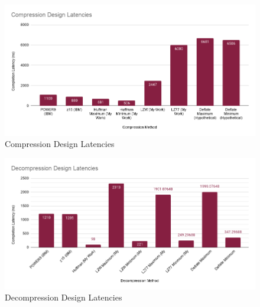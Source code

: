\documentclass[doublespace,nopageskip]{VTthesis}
\begin{document}
\begin{figure}[htb]
	\centering
	\includegraphics[scale=0.5]{Compression Design Latencies.png}
	\caption{Compression Design Latencies}
	\label{fig:compression_design_latencies}
\end{figure}
\begin{figure}[htb]
	\centering
	\includegraphics[scale=0.5]{Decompression Design Latencies.png}
	\caption{Decompression Design Latencies}
	\label{fig:decompression_design_latencies}
\end{figure}
\end{document}
